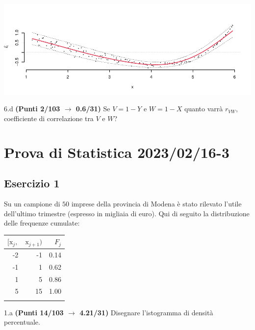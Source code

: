\documentclass[
  11pt,
]{book}
\theoremstyle{mytheoremstyle}
\theoremstyle{mydefstyle}
\newenvironment{sol}
  {
  \begin{tcolorbox}[enhanced,breakable,arc=0.1mm,boxrule=1pt,colback=white,colframe=iblue,
  title=\bf \fontfamily{lmss}\selectfont \hspace{.5 cm} Soluzione,drop fuzzy shadow]

}{
\end{tcolorbox}
  }
\begin{document}
\begin{sol}

\begin{center}\includegraphics{Esami_passati_con_soluzioni_files/figure-latex/2023-26,-1} \end{center}

\end{sol}

6.d \textbf{(Punti 2/103 \(\rightarrow\) 0.6/31)} Se \(V= 1 - Y\) e \(W= 1 - X\) quanto varrà \(r_{VW}\), coefficiente di correlazione tra \(V\) e \(W\)?

\section{Prova di Statistica 2023/02/16-3}\label{prova-di-statistica-20230216-3}

\subsection{Esercizio 1}\label{esercizio-1-24}

Su un campione di \(50\) imprese della provincia di Modena è stato rilevato l'utile dell'ultimo trimestre (espresso in migliaia di euro). Qui di seguito la distribuzione delle frequenze cumulate:

\begin{table}[H]
\centering
\begin{tabular}{rrr}
\toprule
$[\text{x}_j,$ & $\text{x}_{j+1})$ & $F_j$\\
\midrule
-2 & -1 & 0.14\\
-1 & 1 & 0.62\\
1 & 5 & 0.86\\
5 & 15 & 1.00\\
 &  & \\
\bottomrule
\end{tabular}
\end{table}

1.a \textbf{(Punti 14/103 \(\rightarrow\) 4.21/31)} Disegnare l'istogramma di densità percentuale.
\end{document}
